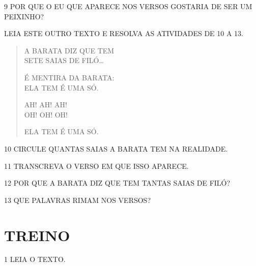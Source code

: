 \num{9} POR QUE O EU QUE APARECE NOS VERSOS GOSTARIA DE SER UM PEIXINHO?


LEIA ESTE OUTRO TEXTO E RESOLVA AS ATIVIDADES DE 10 A 13.

\begin{myquote}
\begin{verse}
A BARATA DIZ QUE TEM\\
SETE SAIAS DE FILÓ\ldots{}

É MENTIRA DA BARATA:\\
ELA TEM É UMA SÓ.

AH! AH! AH!\\
OH! OH! OH!

ELA TEM É UMA SÓ.
\end{verse}

\end{myquote}

\num{10} CIRCULE QUANTAS SAIAS A BARATA TEM NA REALIDADE. 

\vspace{0.3cm}

\num{11} TRANSCREVA O VERSO EM QUE ISSO APARECE.


\num{12} POR QUE A BARATA DIZ QUE TEM TANTAS SAIAS DE FILÓ?


\num{13} QUE PALAVRAS RIMAM NOS VERSOS?




\section*{TREINO}


\num{1} LEIA O TEXTO.

